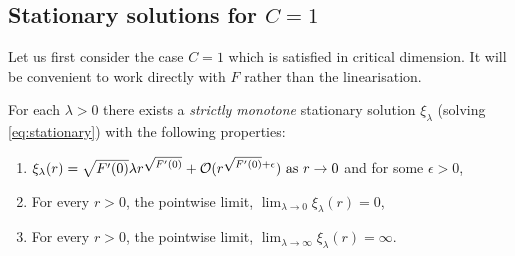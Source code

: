 \documentclass{amsart}
\begin{document}
\subsection{Stationary solutions for \(C=1\)}

Let us first consider the case \(C = 1\) which is satisfied in critical dimension. It will be convenient to work directly with \(F\) rather than the linearisation.

\begin{lemma}
\label{lem:stationaryC1}
For each \(\lambda > 0 \) there exists a \emph{strictly monotone} stationary solution \(\xi_{\lambda}\) (solving \eqref{eq:stationary}) with the following properties:
\begin{enumerate}
\item \(\xi_{\lambda} (r) = \sqrt{F'(0)} \lambda r^{\sqrt{F'(0)}} + \operatorname{\mathcal{O}}(r^{\sqrt{F'(0)} + \epsilon}) \text{ as } r \to 0\) and for some \(\epsilon > 0\), \label{itm:stationaryC1_asymptotic}
\item For every \(r > 0\), the pointwise limit, \(\lim_{\lambda \to 0} \xi_{\lambda} (r) = 0\), \label{itm:stationaryC1_lambda_0}
\item For every \(r > 0\), the pointwise limit, \(\lim_{\lambda \to \infty} \xi_{\lambda} (r) = \infty\). \label{itm:stationaryC1_lambda_infty}
\end{enumerate}
\end{lemma}
\end{document}
